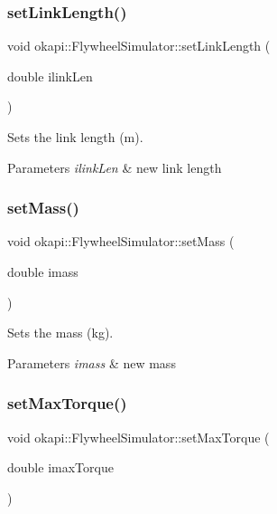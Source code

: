 \subsubsection{\texorpdfstring{setLinkLength()}{setLinkLength()}}
{\footnotesize\ttfamily void okapi\+::\+Flywheel\+Simulator\+::set\+Link\+Length (\begin{DoxyParamCaption}\item[{double}]{ilink\+Len }\end{DoxyParamCaption})}

Sets the link length (m).


\begin{DoxyParams}{Parameters}
{\em ilink\+Len} & new link length \\
\hline
\end{DoxyParams}
\mbox{\label{classokapi_1_1FlywheelSimulator_a0a4b88f87de82603f49e49610fee1eb6}} 
\subsubsection{\texorpdfstring{setMass()}{setMass()}}
{\footnotesize\ttfamily void okapi\+::\+Flywheel\+Simulator\+::set\+Mass (\begin{DoxyParamCaption}\item[{double}]{imass }\end{DoxyParamCaption})}

Sets the mass (kg).


\begin{DoxyParams}{Parameters}
{\em imass} & new mass \\
\hline
\end{DoxyParams}
\mbox{\label{classokapi_1_1FlywheelSimulator_a3b7178f2680fa6533e1056db8f6b1656}} 
\subsubsection{\texorpdfstring{setMaxTorque()}{setMaxTorque()}}
{\footnotesize\ttfamily void okapi\+::\+Flywheel\+Simulator\+::set\+Max\+Torque (\begin{DoxyParamCaption}\item[{double}]{imax\+Torque }\end{DoxyParamCaption})}

